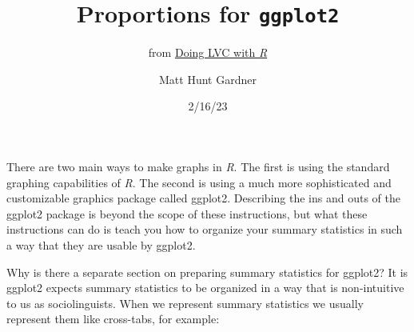 \documentclass[
  10pt,
  letterpaper]{article}
\title{Proportions for \texttt{ggplot2}}
\subtitle{from
\href{https://lingmethodshub.github.io/content/R/lvc_r/}{Doing LVC with
\emph{R}}}
\author{Matt Hunt Gardner}
\date{2/16/23}
\renewcommand\texttt[1]{{\ttfamily\color{BrickRed}#1}}
\begin{document}
\maketitle
\ifdefined\Shaded\renewenvironment{Shaded}{\begin{tcolorbox}[borderline west={3pt}{0pt}{shadecolor}, enhanced, boxrule=0pt, breakable, sharp corners, frame hidden, interior hidden]}{\end{tcolorbox}}\fi

There are two main ways to make graphs in \emph{R}. The first is using
the standard graphing capabilities of \emph{R}. The second is using a
much more sophisticated and customizable graphics package called
\texttt{ggplot2}. Describing the ins and outs of the \texttt{ggplot2}
package is beyond the scope of these instructions, but what these
instructions can do is teach you how to organize your summary statistics
in such a way that they are usable by \texttt{ggplot2}.

Why is there a separate section on preparing summary statistics for
\texttt{ggplot2}? It is \texttt{ggplot2} expects summary statistics to
be organized in a way that is non-intuitive to us as sociolinguists.
When we represent summary statistics we usually represent them like
cross-tabs, for example:
\end{document}
